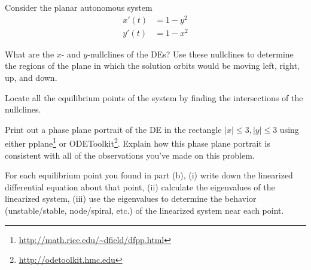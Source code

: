 \documentclass[boxes]{gsypset}
\begin{document}
	\begin{problem}
		Consider the planar autonomous system 
		\begin{align*}
			x'(t) &= 1-y^2\\
			y'(t) &= 1-x^2
		\end{align*}
		
		\begin{subproblems}
			\subproblem 
				What are the $x$- and $y$-nullclines of the DEs? 
				Use these nullclines to determine the regions of the plane in which 
				the solution orbits would be moving left, right, up, and down.
				\begin{solution}
					
				\end{solution}
			\subproblem 
				Locate all the equilibrium points of the system 
				by finding the intersections of the nullclines.
				\begin{solution}
					
				\end{solution}
			\subproblem 
				Print out a phase plane portrait of the DE in the rectangle $|x|\leq 3, |y| \leq 3$ 
				using either pplane\footnote{\url{http://math.rice.edu/~dfield/dfpp.html}} or
				ODEToolkit\footnote{\url{http://odetoolkit.hmc.edu}}. 
				Explain how this phase plane portrait is consistent with all of the 
				observations you've made on this problem.
				\begin{solution}
					
				\end{solution}
			\subproblem 
				For each equilibrium point you found in part (b), 
				(i) write down the linearized differential equation about that point, 
				(ii) calculate the eigenvalues of the linearized system, 
				(iii) use the eigenvalues to determine the behavior (unstable/stable, node/spiral, etc.) 
				of the linearized system near each point.
				\begin{solution}
					
				\end{solution}
		\end{subproblems}
	\end{problem}
	
\end{document}
